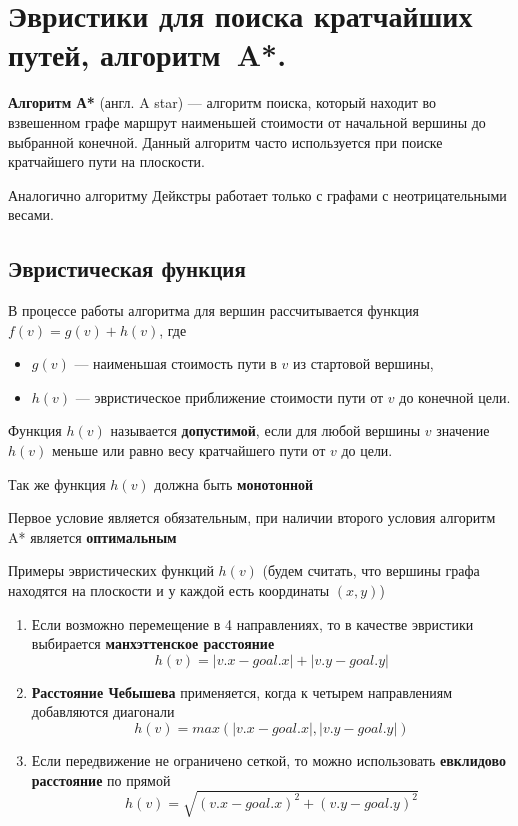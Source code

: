 \section{Эвристики для поиска кратчайших путей, алгоритм~A*.}

\begin{definition}
\textbf{Алгоритм А*} (англ. A star) — алгоритм поиска, который находит во взвешенном графе маршрут наименьшей стоимости от начальной вершины до выбранной конечной.
Данный алгоритм часто используется при поиске кратчайшего пути на плоскости.

Аналогично алгоритму Дейкстры работает только с графами с неотрицательными весами. 
\end{definition}

\subsection*{Эвристическая функция}

В процессе работы алгоритма для вершин рассчитывается функция  $f(v)=g(v)+h(v)$, где
\begin{itemize}
	\item $g(v)$ --- наименьшая стоимость пути в $v$
	из стартовой вершины,
	\item $h(v)$ --- эвристическое приближение стоимости пути от $v$ до конечной цели.
\end{itemize}

Функция $h(v)$ называется \textbf{допустимой}, если для любой вершины $v$ значение $h(v)$ меньше или равно весу кратчайшего пути от $v$ до цели.

Так же функция $h(v)$ должна быть \textbf{монотонной}

Первое условие является обязательным, при наличии второго условия алгоритм A* является \textbf{оптимальным}

Примеры эвристических функций $h(v)$ (будем считать, что вершины графа находятся на плоскости и у каждой есть координаты $(x, y)$)
\begin{enumerate}
	\item Если возможно перемещение в 4 направлениях, то в качестве эвристики выбирается \textbf{манхэттенское расстояние}
	$$h(v) = |v.x - goal.x| + |v.y - goal.y|$$
	\item \textbf{Расстояние Чебышева} применяется, когда к четырем направлениям добавляются диагонали
	$$h(v) = max\left(|v.x - goal.x|, |v.y - goal.y|\right)$$
	\item Если передвижение не ограничено сеткой, то можно использовать \textbf{евклидово расстояние} по прямой
	$$h(v) = \sqrt{(v.x - goal.x)^2 + (v.y - goal.y)^2}$$
\end{enumerate}

